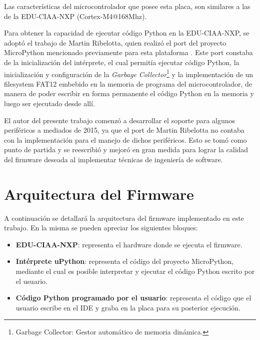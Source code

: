Las características del microcontrolador que posee esta placa, son similares a las de la EDU-CIAA-NXP (Cortex-M4@168Mhz).

Para obtener la capacidad de ejecutar código Python en la EDU-CIAA-NXP, se adoptó el trabajo de Martin Ribelotta, quien realizó el port del proyecto MicroPython mencionado previamente para esta plataforma \cite{portmicropythonribelotta}.
Este port constaba de la inicialización del intérprete, el cual permitía ejecutar código Python, la inicialización y configuración de la \textit{Garbage Collector}\footnote{Garbage Collector: Gestor automático de memoria dinámica.} y la implementación de un filesystem FAT12 embebido en la memoria de programa del microcontrolador, de manera de poder escribir en forma permanente el código Python en la memoria y luego ser ejecutado desde allí. 


El autor del presente trabajo comenzó a desarrollar el soporte para algunos periféricos a mediados de 2015, ya que el port de Martin Ribelotta no contaba con la implementación para el manejo de dichos periféricos. Esto se tomó como punto de partida y se reescribió y mejoró en gran medida para lograr la calidad del firmware deseada al implementar técnicas de ingeniería de software.

\section{Arquitectura del Firmware}
\label{sec:firmwareArq}

A continuación se detallará la arquitectura del firmware implementado en este trabajo. En la misma se pueden apreciar los siguientes bloques:

\begin{itemize}
	\item \textbf{EDU-CIAA-NXP}: representa el hardware donde se ejecuta el firmware.
	\item \textbf{Intérprete uPython}: representa el código del proyecto MicroPython, mediante el cual es posible interpretar y ejecutar el código Python escrito por el usuario.
	\item \textbf{Código Python programado por el usuario}: representa el código que el usuario escribe en el IDE y graba en la placa para su posterior ejecución.
\end{itemize}

